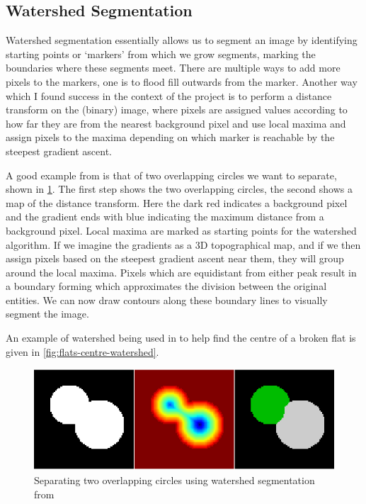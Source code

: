 \subsection{Watershed Segmentation}

Watershed segmentation essentially allows us to segment an image by identifying starting points or `markers' from which we grow segments, marking the boundaries where these segments meet. There are multiple ways to add more pixels to the markers, one is to flood fill outwards from the marker. Another way which I found success in the context of the \noteED project is to perform a distance transform on the (binary) image, where pixels are assigned values according to how far they are from the nearest background pixel and use local maxima and assign pixels to the maxima depending on which marker is reachable by the steepest gradient ascent.

A good example from \citeauthor{scikit-watershed} is that of two overlapping circles we want to separate, shown in \cref{fig:watershed-circles}. The first step shows the two overlapping circles, the second shows a map of the distance transform. Here the dark red indicates a background pixel and the gradient ends with blue indicating the maximum distance from a background pixel. Local maxima are marked as starting points for the watershed algorithm. If we imagine the gradients as a 3D topographical map, and if we then assign pixels based on the steepest gradient ascent near them, they will group around the local maxima. Pixels which are equidistant from either peak result in a boundary forming which approximates the division between the original entities. We can now draw contours along these boundary lines to visually segment the image.

An example of watershed being used in \noteED to help find the centre of a broken flat is given in \cref{fig:flats-centre-watershed}.

\begin{figure}[hbt]
  \includegraphics[width=\linewidth]{gfx/techniques/plot_watershed_1.png}
  \caption{Separating two overlapping circles using watershed segmentation from \citeauthor{scikit-watershed}}
  \label{fig:watershed-circles}
\end{figure}


